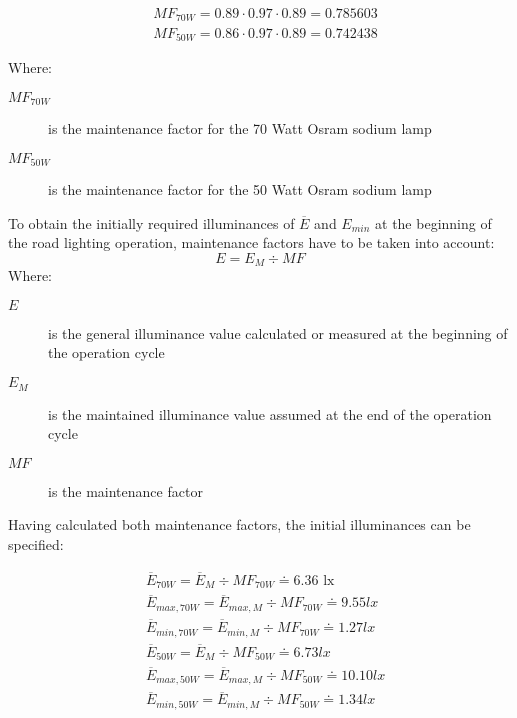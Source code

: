 \begin{align}
&MF_{70W} = 0.89 \cdot 0.97 \cdot 0.89 = 0.785603\\
&MF_{50W} = 0.86 \cdot 0.97 \cdot 0.89 = 0.742438
\end{align}

Where:
\begin{description}
	\item[$MF_{70W}$] is the maintenance factor for the 70 Watt Osram sodium lamp
	\item[$MF_{50W}$] is the maintenance factor for the 50 Watt Osram sodium lamp
\end{description}

To obtain the initially required illuminances of $\overline{E}$ and $E_{min}$ at the beginning of the road lighting operation, maintenance factors have to be taken into account:
\begin{equation}
E = E_{M} \div MF
\end{equation}
Where:
\begin{description}
	\item[$E$] is the general illuminance value calculated or measured at the beginning of the operation cycle
	\item[$E_{M}$] is the maintained illuminance value assumed at the end of the operation cycle
	\item[$MF$] is the maintenance factor
\end{description}

Having calculated both maintenance factors, the initial illuminances can be specified:

\begin{align}
&\overline{E}_{70W} = \overline{E}_{M} \div MF_{70W} \doteq 6.36 \text{ lx}\\
&\overline{E}_{max,70W} = \overline{E}_{max,M} \div MF_{70W} \doteq 9.55 lx\\
&\overline{E}_{min,70W} = \overline{E}_{min,M} \div MF_{70W} \doteq 1.27 lx\\
&\overline{E}_{50W} = \overline{E}_{M} \div MF_{50W} \doteq 6.73 lx\\
&\overline{E}_{max,50W} = \overline{E}_{max,M} \div MF_{50W} \doteq 10.10 lx\\
&\overline{E}_{min,50W} = \overline{E}_{min,M} \div MF_{50W} \doteq 1.34 lx
\end{align}
